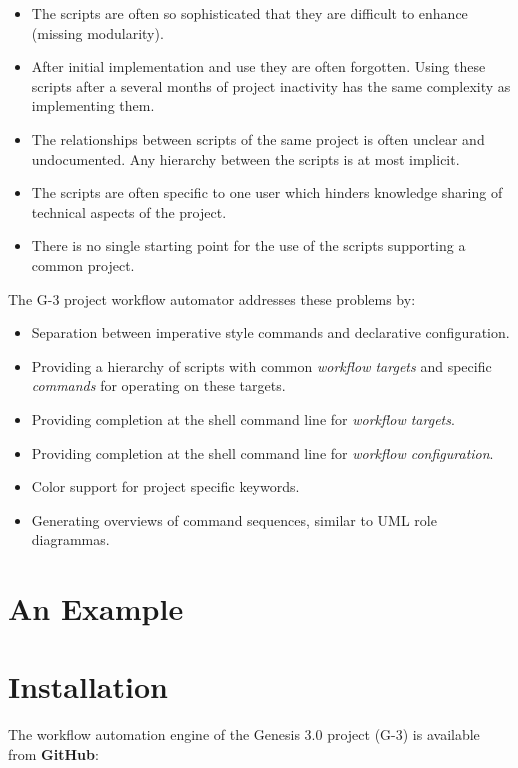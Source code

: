 \documentclass[a4paper,openbib,10pt]{article}
\begin{document}
\begin{itemize}
\item The scripts are often so sophisticated that they are difficult
  to enhance (missing modularity).
\item After initial implementation and use they are often forgotten.
  Using these scripts after a several months of project inactivity has
  the same complexity as implementing them.
\item The relationships between scripts of the same project is often
  unclear and undocumented.  Any hierarchy between the scripts is at
  most implicit.
\item The scripts are often specific to one user which hinders
  knowledge sharing of technical aspects of the project.
\item There is no single starting point for the use of the scripts
  supporting a common project.
\end{itemize}

\vspace{4mm}

The G-3 project workflow automator addresses these problems by:

\begin{itemize}
\item Separation between imperative style commands and declarative
  configuration.
\item Providing a hierarchy of scripts with common {\it workflow
    targets} and specific {\it commands} for operating on these
  targets.
\item Providing completion at the shell command line for {\it workflow
    targets}.
\item Providing completion at the shell command line for {\it workflow
    configuration}.
\item Color support for project specific keywords.
\item Generating overviews of command sequences, similar to UML role
  diagrammas.
\end{itemize}

\section{An Example}


\section{Installation}

The workflow automation engine of the Genesis 3.0 project (G-3) is
available from {\bf GitHub}:
\end{document}
